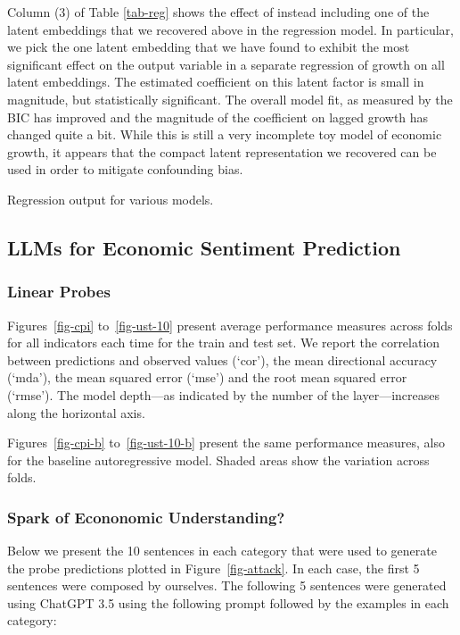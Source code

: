 Column (3) of Table \ref{tab-reg} shows the effect of instead including one of the latent embeddings that we recovered above in the regression model. In particular, we pick the one latent embedding that we have found to exhibit the most significant effect on the output variable in a separate regression of growth on all latent embeddings. The estimated coefficient on this latent factor is small in magnitude, but statistically significant. The overall model fit, as measured by the BIC has improved and the magnitude of the coefficient on lagged growth has changed quite a bit. While this is still a very incomplete toy model of economic growth, it appears that the compact latent representation we recovered can be used in order to mitigate confounding bias.

\begin{table}
\caption{Regression output for various models.}\label{tab-reg}%

\end{table}

\subsection{LLMs for Economic Sentiment Prediction}

\subsubsection{Linear Probes}

Figures~\ref{fig-cpi} to~\ref{fig-ust-10} present average performance measures across folds for all indicators each time for the train and test set. We report the correlation between predictions and observed values (`cor'), the mean directional accuracy (`mda'), the mean squared error (`mse') and the root mean squared error (`rmse'). The model depth---as indicated by the number of the layer---increases along the horizontal axis.

Figures~\ref{fig-cpi-b} to~\ref{fig-ust-10-b} present the same performance measures, also for the baseline autoregressive model. Shaded areas show the variation across folds.

\subsubsection{Spark of Econonomic Understanding?}\label{appendix:sentences}

Below we present the 10 sentences in each category that were used to generate the probe predictions plotted in Figure~\ref{fig-attack}. In each case, the first 5 sentences were composed by ourselves. The following 5 sentences were generated using ChatGPT 3.5 using the following prompt followed by the examples in each category:

